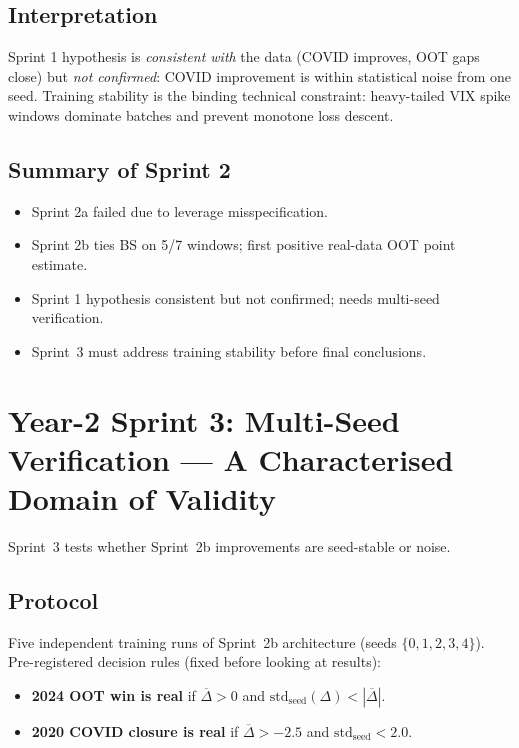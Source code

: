 \documentclass[11pt, a4paper]{article}
\begin{document}
\subsection{Interpretation}

Sprint 1 hypothesis is \emph{consistent with} the data (COVID improves, OOT gaps close)
but \emph{not confirmed}: COVID improvement is within statistical noise from one seed.
Training stability is the binding technical constraint: heavy-tailed VIX spike windows
dominate batches and prevent monotone loss descent.

\subsection{Summary of Sprint 2}
\begin{itemize}
\item Sprint 2a failed due to leverage misspecification.
\item Sprint 2b ties BS on 5/7 windows; first positive real-data OOT point estimate.
\item Sprint 1 hypothesis consistent but not confirmed; needs multi-seed verification.
\item Sprint~3 must address training stability before final conclusions.
\end{itemize}


\section{Year-2 Sprint 3: Multi-Seed Verification --- A Characterised Domain of Validity}
\label{sec:sprint3}

Sprint~3 tests whether Sprint~2b improvements are seed-stable or noise.

\subsection{Protocol}

Five independent training runs of Sprint~2b architecture (seeds $\{0,1,2,3,4\}$).
Pre-registered decision rules (fixed before looking at results):
\begin{itemize}
\item \textbf{2024 OOT win is real} if $\overline{\Delta}>0$ and
      $\mathrm{std}_{\text{seed}}(\Delta) < |\overline{\Delta}|$.
\item \textbf{2020 COVID closure is real} if
      $\overline{\Delta} > -2.5$ and $\mathrm{std}_{\text{seed}} < 2.0$.
\end{itemize}
\end{document}

